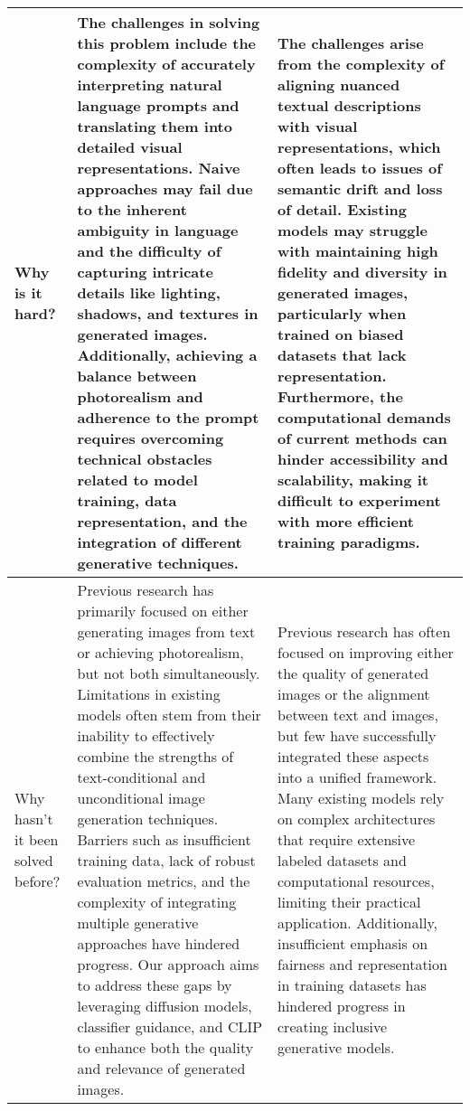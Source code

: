 \begin{table*}[htbp]
\begin{tabular}{p{3cm}p{6cm}p{6cm}}
Why is it hard? & 
The challenges in solving this problem include the complexity of accurately interpreting natural language prompts and translating them into detailed visual representations. Naive approaches may fail due to the inherent ambiguity in language and the difficulty of capturing intricate details like lighting, shadows, and textures in generated images. Additionally, achieving a balance between photorealism and adherence to the prompt requires overcoming technical obstacles related to model training, data representation, and the integration of different generative techniques. &
The challenges arise from the complexity of aligning nuanced textual descriptions with visual representations, which often leads to issues of semantic drift and loss of detail. Existing models may struggle with maintaining high fidelity and diversity in generated images, particularly when trained on biased datasets that lack representation. Furthermore, the computational demands of current methods can hinder accessibility and scalability, making it difficult to experiment with more efficient training paradigms.
\\ \midrule

Why hasn't it been solved before? & 
Previous research has primarily focused on either generating images from text or achieving photorealism, but not both simultaneously. Limitations in existing models often stem from their inability to effectively combine the strengths of text-conditional and unconditional image generation techniques. Barriers such as insufficient training data, lack of robust evaluation metrics, and the complexity of integrating multiple generative approaches have hindered progress. Our approach aims to address these gaps by leveraging diffusion models, classifier guidance, and CLIP to enhance both the quality and relevance of generated images. &
Previous research has often focused on improving either the quality of generated images or the alignment between text and images, but few have successfully integrated these aspects into a unified framework. Many existing models rely on complex architectures that require extensive labeled datasets and computational resources, limiting their practical application. Additionally, insufficient emphasis on fairness and representation in training datasets has hindered progress in creating inclusive generative models.
\\ \midrule


\end{tabular}
\end{table*}
